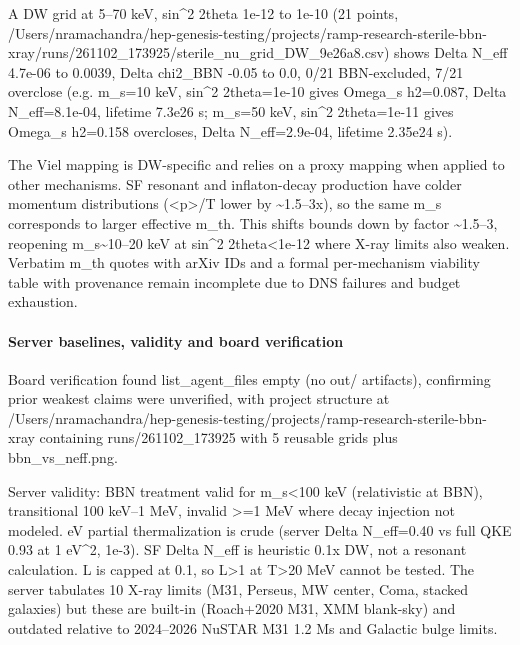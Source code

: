 \documentclass[11pt,a4paper]{article}
\begin{document}
A DW grid at 5--70 keV, sin\textasciicircum{}2 2theta 1e-12 to 1e-10 (21 points, /Users/nramachandra/hep-genesis-testing/projects/ramp-research-sterile-bbn-xray/runs/261102\_173925/sterile\_nu\_grid\_DW\_9e26a8.csv) shows Delta N\_eff 4.7e-06 to 0.0039, Delta chi2\_BBN -0.05 to 0.0, 0/21 BBN-excluded, 7/21 overclose (e.g. m\_s=10 keV, sin\textasciicircum{}2 2theta=1e-10 gives Omega\_s h2=0.087, Delta N\_eff=8.1e-04, lifetime 7.3e26 s; m\_s=50 keV, sin\textasciicircum{}2 2theta=1e-11 gives Omega\_s h2=0.158 overcloses, Delta N\_eff=2.9e-04, lifetime 2.35e24 s).

The Viel mapping is DW-specific and relies on a proxy mapping when applied to other mechanisms. SF resonant and inflaton-decay production have colder momentum distributions (\textless{}p\textgreater{}/T lower by \textasciitilde{}1.5--3x), so the same m\_s corresponds to larger effective m\_th. This shifts bounds down by factor \textasciitilde{}1.5--3, reopening m\_s\textasciitilde{}10--20 keV at sin\textasciicircum{}2 2theta\textless{}1e-12 where X-ray limits also weaken. Verbatim m\_th quotes with arXiv IDs and a formal per-mechanism viability table with provenance remain incomplete due to DNS failures and budget exhaustion.

\paragraph{Server baselines, validity and board verification}
Board verification found list\_agent\_files empty (no out/ artifacts), confirming prior weakest claims were unverified, with project structure at /Users/nramachandra/hep-genesis-testing/projects/ramp-research-sterile-bbn-xray containing runs/261102\_173925 with 5 reusable grids plus bbn\_vs\_neff.png.

Server validity: BBN treatment valid for m\_s\textless{}100 keV (relativistic at BBN), transitional 100 keV--1 MeV, invalid \textgreater{}=1 MeV where decay injection not modeled. eV partial thermalization is crude (server Delta N\_eff=0.40 vs full QKE 0.93 at 1 eV\textasciicircum{}2, 1e-3). SF Delta N\_eff is heuristic 0.1x DW, not a resonant calculation. L is capped at 0.1, so L\textgreater{}1 at T\textgreater{}20 MeV cannot be tested. The server tabulates 10 X-ray limits (M31, Perseus, MW center, Coma, stacked galaxies) but these are built-in (Roach+2020 M31, XMM blank-sky) and outdated relative to 2024--2026 NuSTAR M31 1.2 Ms and Galactic bulge limits.
\end{document}
